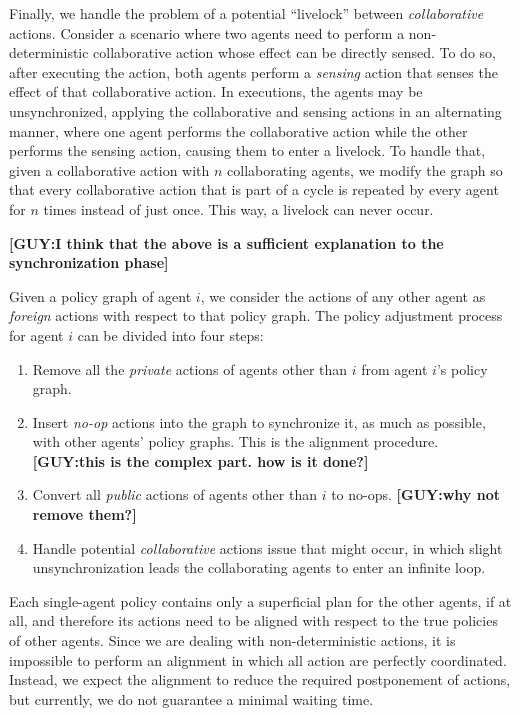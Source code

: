 \documentclass[letterpaper]{article} %
\theoremstyle{definition}
\newcommand{\guy}[1]{\textbf{[\color{orange}GUY:#1]}}
\begin{document}
Finally, we handle the problem of a potential ``livelock'' between \emph{collaborative} actions. Consider a scenario where two agents need to perform a non-deterministic collaborative action whose effect can be directly sensed. To do so, after executing the action, both agents perform a \emph{sensing} action that senses the effect of that collaborative action.
In executions, the agents may be unsynchronized,  applying the collaborative and sensing actions in an alternating manner, where one agent performs the collaborative action while the other performs the sensing action, causing them to enter a livelock. To handle that, given a collaborative action with $n$ collaborating agents, we modify the graph so that every collaborative action that is part of a cycle is repeated by every agent for $n$ times instead of just once. This way, a livelock can never occur.

\guy{I think that the above is a sufficient explanation to the synchronization phase}




Given a policy graph of agent $i$, we consider the actions of any other agent as \emph{foreign} actions with respect to that policy graph. The policy adjustment process for agent $i$ can be divided into four steps:
\begin{enumerate}
    \item Remove all the \emph{private} actions of agents other than $i$ from agent $i$'s policy graph.
    \item Insert \emph{no-op} actions into the graph to synchronize it, as much as possible, with other agents' policy graphs. This is the alignment procedure. \guy{this is the complex part. how is it done?}
    \item Convert all \emph{public} actions of  agents other than $i$ to no-ops. \guy{why not remove them?}
    \item Handle potential \emph{collaborative} actions issue that might occur, in which slight unsynchronization leads the collaborating agents to enter an infinite loop.
\end{enumerate}

Each single-agent policy contains only a superficial plan for the other agents, if at all, and therefore its actions need to be aligned with respect to the true policies of other agents. 
Since we are dealing with non-deterministic actions, it is impossible to perform an alignment in which all action are perfectly coordinated. Instead, we expect the alignment to reduce the required postponement of actions, but currently, we do not guarantee a minimal waiting time.
\end{document}
